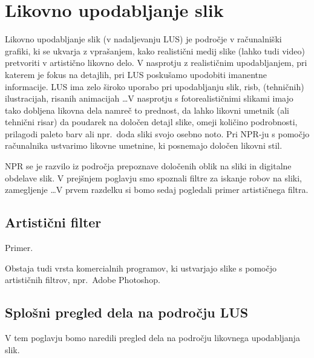 \chapter{Likovno upodabljanje slik}\label{sec:LikovnoUpodabljanjeSlik}
%
Likovno upodabljanje slik (v nadaljevanju LUS) je področje v računalniški grafiki, ki se ukvarja z vprašanjem, kako realistični medij slike (lahko tudi video) pretvoriti v artistično likovno delo. V nasprotju z realističnim upodabljanjem, pri katerem je fokus na detajlih, pri LUS poskušamo upodobiti imanentne informacije. LUS ima zelo široko uporabo pri upodabljanju slik, risb, (tehničnih) ilustracijah, risanih animacijah \ldots V nasprotju s fotorealističnimi slikami imajo tako dobljena likovna dela namreč to prednost, da lahko likovni umetnik (ali tehnični risar) da poudarek na določen detajl slike, omeji količino podrobnosti, prilagodi paleto barv ali npr.\ doda sliki svojo osebno noto. Pri NPR-ju s pomočjo računalnika ustvarimo likovne umetnine, ki posnemajo določen likovni stil.

NPR se je razvilo iz področja prepoznave določenih oblik na sliki in digitalne obdelave slik. V prejšnjem poglavju smo spoznali filtre za iskanje robov na sliki, zamegljenje \ldots V prvem razdelku si bomo sedaj pogledali primer artističnega filtra.

\section{Artistični filter}
Primer.

Obstaja tudi vrsta komercialnih programov, ki ustvarjajo slike s pomočjo artističnih filtrov, npr.\ Adobe Photoshop.
\section{Splošni pregled dela na področju LUS}\label{SplosniPregled}
%
V tem poglavju bomo naredili pregled dela na področju likovnega upodabljanja slik.
%
